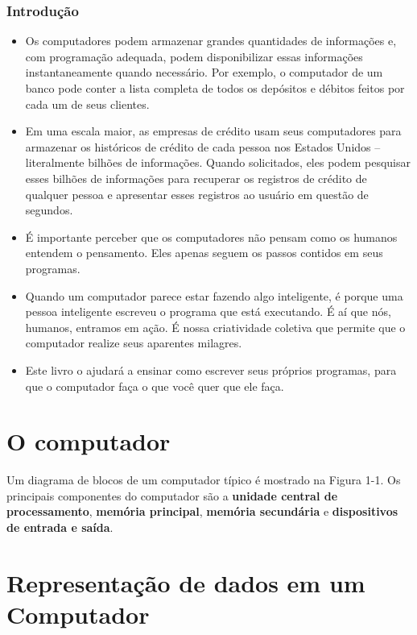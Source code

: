 \begin{frame}
\frametitle{Introdução}
  \begin{itemize}
  \item Os computadores podem armazenar grandes quantidades de informações e, com programação adequada, podem disponibilizar essas informações instantaneamente quando necessário. Por exemplo, o computador de um banco pode conter a lista completa de todos os depósitos e débitos feitos por cada um de seus clientes. 
  \item Em uma escala maior, as empresas de crédito usam seus computadores para armazenar os históricos de crédito de cada pessoa nos Estados Unidos – literalmente bilhões de informações. Quando solicitados, eles podem pesquisar esses bilhões de informações para recuperar os registros de crédito de qualquer pessoa e apresentar esses registros ao usuário em questão de segundos.
  \end{itemize}
\end{frame}
\begin{frame}
  \begin{itemize}
  \item É importante perceber que os computadores não pensam como os humanos entendem o pensamento. Eles apenas seguem os passos contidos em seus programas. 
  \item Quando um computador parece estar fazendo algo inteligente, é porque uma pessoa inteligente escreveu o programa que está executando. É aí que nós, humanos, entramos em ação. É nossa criatividade coletiva que permite que o computador realize seus aparentes milagres. 
  \item Este livro o ajudará a ensinar como escrever seus próprios programas, para que o computador faça o que você quer que ele faça.
\end{itemize}
\end{frame}
\section{O computador}
\begin{frame}
Um diagrama de blocos de um computador típico é mostrado na Figura 1-1. Os principais componentes do computador são a \textbf{unidade central de processamento}, \textbf{memória principal}, \textbf{memória secundária} e \textbf{dispositivos de entrada e saída}. 
\end{frame}
\section{Representação de dados em um Computador}
\begin{frame}
\end{frame}
